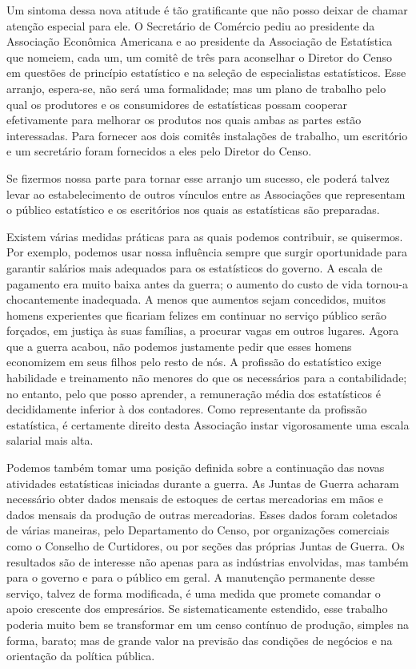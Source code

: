 \documentclass[12pt]{article}
\begin{document}
Um sintoma dessa nova atitude é tão gratificante que não posso deixar de chamar atenção especial para ele. O Secretário de Comércio pediu ao presidente da Associação Econômica Americana e ao presidente da Associação de Estatística que nomeiem, cada um, um comitê de três para aconselhar o Diretor do Censo em questões de princípio estatístico e na seleção de especialistas estatísticos. Esse arranjo, espera-se, não será uma formalidade; mas um plano de trabalho pelo qual os produtores e os consumidores de estatísticas possam cooperar efetivamente para melhorar os produtos nos quais ambas as partes estão interessadas. Para fornecer aos dois comitês instalações de trabalho, um escritório e um secretário foram fornecidos a eles pelo Diretor do Censo.

Se fizermos nossa parte para tornar esse arranjo um sucesso, ele poderá talvez levar ao estabelecimento de outros vínculos entre as Associações que representam o público estatístico e os escritórios nos quais as estatísticas são preparadas.

Existem várias medidas práticas para as quais podemos contribuir, se quisermos. Por exemplo, podemos usar nossa influência sempre que surgir oportunidade para garantir salários mais adequados para os estatísticos do governo. A escala de pagamento era muito baixa antes da guerra; o aumento do custo de vida tornou-a chocantemente inadequada. A menos que aumentos sejam concedidos, muitos homens experientes que ficariam felizes em continuar no serviço público serão forçados, em justiça às suas famílias, a procurar vagas em outros lugares. Agora que a guerra acabou, não podemos justamente pedir que esses homens economizem em seus filhos pelo resto de nós. A profissão do estatístico exige habilidade e treinamento não menores do que os necessários para a contabilidade; no entanto, pelo que posso aprender, a remuneração média dos estatísticos é decididamente inferior à dos contadores. Como representante da profissão estatística, é certamente direito desta Associação instar vigorosamente uma escala salarial mais alta.

Podemos também tomar uma posição definida sobre a continuação das novas atividades estatísticas iniciadas durante a guerra. As Juntas de Guerra acharam necessário obter dados mensais de estoques de certas mercadorias em mãos e dados mensais da produção de outras mercadorias. Esses dados foram coletados de várias maneiras, pelo Departamento do Censo, por organizações comerciais como o Conselho de Curtidores, ou por seções das próprias Juntas de Guerra. Os resultados são de interesse não apenas para as indústrias envolvidas, mas também para o governo e para o público em geral. A manutenção permanente desse serviço, talvez de forma modificada, é uma medida que promete comandar o apoio crescente dos empresários. Se sistematicamente estendido, esse trabalho poderia muito bem se transformar em um censo contínuo de produção, simples na forma, barato; mas de grande valor na previsão das condições de negócios e na orientação da política pública.
\end{document}
